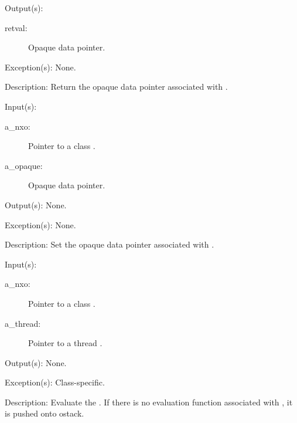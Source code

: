 \begin{capi}
\begin{capilist}
	\item[Output(s): ]
		\begin{description}\item[]
		\item[retval: ]
			Opaque data pointer.
		\end{description}
	\item[Exception(s): ] None.
	\item[Description: ]
		Return the opaque data pointer associated with .
	\end{capilist}
\label{nxo_class_opaque_set}
	\begin{capilist}
	\item[Input(s): ]
		\begin{description}\item[]
		\item[a\_nxo: ]
			Pointer to a class .
		\item[a\_opaque: ]
			Opaque data pointer.
		\end{description}
	\item[Output(s): ] None.
	\item[Exception(s): ] None.
	\item[Description: ]
		Set the opaque data pointer associated with .
	\end{capilist}
\label{nxo_class_eval}
	\begin{capilist}
	\item[Input(s): ]
		\begin{description}\item[]
		\item[a\_nxo: ]
			Pointer to a class \classname{nxo}.
		\item[a\_thread: ]
			Pointer to a thread \classname{nxo}.
		\end{description}
	\item[Output(s): ] None.
	\item[Exception(s): ] Class-specific.
	\item[Description: ]
		Evaluate the .  If there is no evaluation function
		associated with , it is pushed onto ostack.
	\end{capilist}
\end{capi}
